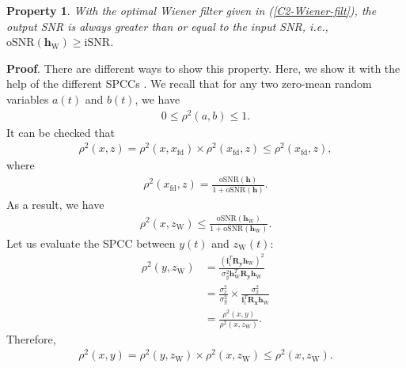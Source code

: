 \documentclass[10pt,pdflatex,headrule,landscape]{beamer}
\newtheorem{property}{Property}[section]
\begin{document}
\begin{frame}[allowframebreaks]

\begin{property}
With the optimal Wiener filter given in (\ref{C2-Wiener-filt}), the output SNR is always greater than or equal to the input SNR, i.e., $\mathrm{oSNR}\left( \mathbf{h}_{\mathrm{W}} \right) \geq \mathrm{iSNR}$.
\end{property}

\noindent \textbf{Proof}. There are different ways to show this property. Here, we show it with the help of the different SPCCs \cite{C2-benesty2008}. We recall that for any two zero-mean random variables $a(t)$ and $b(t)$, we have
\begin{eqnarray}
 0 \leq \rho^2\left(a,b \right) \leq 1 .
\end{eqnarray}
It can be checked that
\begin{eqnarray}
\label{C2-SPCC-xz}
 \rho^2\left(x,z \right) = \rho^2\left(x,x_{\mathrm{fd}} \right) \times \rho^2\left(x_{\mathrm{fd}},z \right) \leq
 \rho^2\left(x_{\mathrm{fd}},z \right),
\end{eqnarray}
where
\begin{eqnarray}
\label{C2-SPCC-xfdz}
 \rho^2\left(x_{\mathrm{fd}},z \right) = \frac{ \mathrm{oSNR}\left( \mathbf{h} \right) } { 1 + \mathrm{oSNR}\left( \mathbf{h} \right) }.
\end{eqnarray}
As a result, we have
\begin{eqnarray}
\label{C2-SPCC-xz-inq}
 \rho^2\left(x,z_{\mathrm{W}} \right) \leq \frac{ \mathrm{oSNR}\left( \mathbf{h}_{\mathrm{W}} \right) }
 { 1 + \mathrm{oSNR}\left( \mathbf{h}_{\mathrm{W}} \right) }.
\end{eqnarray}
Let us evaluate the SPCC between $y(t)$ and $z_{\mathrm{W}}(t)$:
\begin{align*}
 \rho^2(y,z_{\mathrm{W}}) &=
 \frac{ \left( \mathbf{i}_{\mathrm{i}}^T \mathbf{R}_{\mathbf{y}} \mathbf{h}_{\mathrm{W}} \right)^2 }
 { \sigma_y^2 \mathbf{h}_{\mathrm{W}}^T \mathbf{R}_{\mathbf{y}} \mathbf{h}_{\mathrm{W}} } \nonumber \\
 &= \frac{ \sigma_x^2 } { \sigma_y^2 } \times
 \frac{ \sigma_x^2 } { \mathbf{i}_{\mathrm{i}}^T \mathbf{R}_{\mathbf{x}} \mathbf{h}_{\mathrm{W}} } \nonumber \\
 &= \frac{ \rho^2(x,y) } { \rho^2(x,z_{\mathrm{W}}) }.
\end{align*}
Therefore,
\begin{eqnarray}
\label{C2-SPCC-xy-inq}
 \rho^2(x,y) = \rho^2(y,z_{\mathrm{W}}) \times \rho^2(x,z_{\mathrm{W}}) \leq \rho^2(x,z_{\mathrm{W}}).
\end{eqnarray}


\end{frame}
\end{document}
